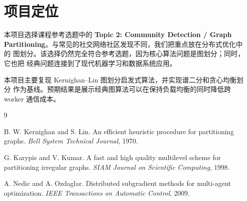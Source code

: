 \documentclass[UTF8, 11pt]{ctexart}
\begin{document}
\section{项目定位}

本项目选择课程参考选题中的 \textbf{Topic 2: Community Detection / Graph
Partitioning}。与常见的社交网络社区发现不同，我们把重点放在分布式优化中的
图划分。该选择仍然完全符合参考选题，因为核心算法问题是图划分；同时，它也把
经典问题连接到了现代机器学习和数据系统应用。

本项目主要复现 Kernighan--Lin 图划分启发式算法，并实现谱二分和贪心均衡划分
作为基线。预期结果是展示经典图算法可以在保持负载均衡的同时降低跨 worker
通信成本。

\begin{thebibliography}{9}

B. W. Kernighan and S. Lin.
\newblock An efficient heuristic procedure for partitioning graphs.
\newblock \emph{Bell System Technical Journal}, 1970.

G. Karypis and V. Kumar.
\newblock A fast and high quality multilevel scheme for partitioning irregular graphs.
\newblock \emph{SIAM Journal on Scientific Computing}, 1998.

A. Nedic and A. Ozdaglar.
\newblock Distributed subgradient methods for multi-agent optimization.
\newblock \emph{IEEE Transactions on Automatic Control}, 2009.

\end{thebibliography}
\end{document}
